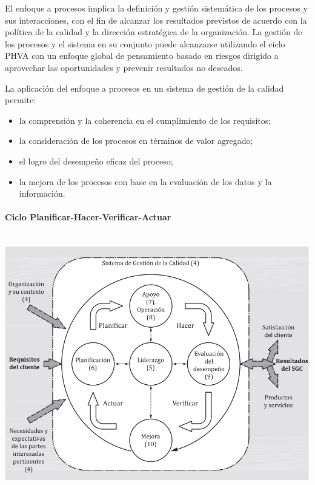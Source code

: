 				\par \noindent
					El enfoque a procesos implica la definición y gestión sistemática de los procesos y sus interacciones,
					con el fin de alcanzar los resultados previstos de acuerdo con la política de la calidad y la dirección
					estratégica de la organización. La gestión de los procesos y el sistema en su conjunto puede alcanzarse
					utilizando el ciclo PHVA con un enfoque global de pensamiento basado en riesgos dirigido a aprovechar las oportunidades y prevenir resultados no deseados.
				
				\par \noindent
					La aplicación del enfoque a procesos en un sistema de gestión de la calidad permite:
					
					\begin{itemize}
						
						\item la comprensión y la coherencia en el cumplimiento de los requisitos;
						
						\item la consideración de los procesos en términos de valor agregado;
						
						\item el logro del desempeño eficaz del proceso;
						
						\item la mejora de los procesos con base en la evaluación de los datos y la información.
						
					\end{itemize}
				
				\newpage
				\thispagestyle{plain}
			
			\paragraph{Ciclo Planificar-Hacer-Verificar-Actuar}\mbox{}\\

				\includegraphics[width=\linewidth]{figura1.png}
	
